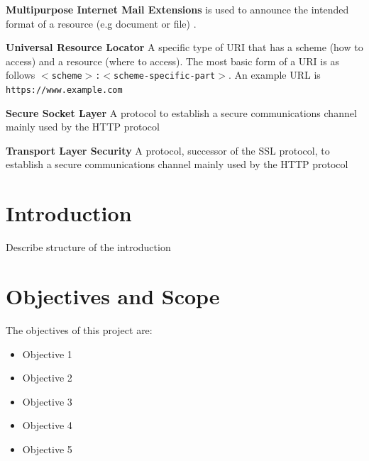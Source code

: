\documentclass{mscreport}
\begin{document}
\begin{hangparas}{.25in}{1}
\textbf{Multipurpose Internet Mail Extensions} is used to announce the intended format of a resource (e.g document or file) \cite{Freed2013-yn}. \par
\vspace{0.5cm}
\textbf{Universal Resource Locator} A specific type of URI that has a scheme (how to access) and a resource (where to access). The most basic form of a URI is as follows \texttt{$<$scheme$>$:$<$scheme-specific-part$>$}. An example URL is \texttt{https://www.example.com} \par
\vspace{0.5cm}
\textbf{Secure Socket Layer} A protocol to establish a secure communications channel mainly used by the HTTP protocol \par
\vspace{0.5cm}
\textbf{Transport Layer Security} A protocol, successor of the SSL protocol, to establish a secure communications channel mainly used by the HTTP protocol \par

\end{hangparas}
\clearpage
\newpage

\listoffigures

\clearpage
\newpage
{}
\listoftables

\clearpage
\newpage





\tableofcontents

\newpage
{}
\section{Introduction}

Describe structure of the introduction

\section{Objectives and Scope}

The objectives of this project are:
\begin{itemize}
  \item Objective 1
  \item Objective 2
  \item Objective 3
  \item Objective 4
  \item Objective 5
\end{itemize}  
\end{document}
